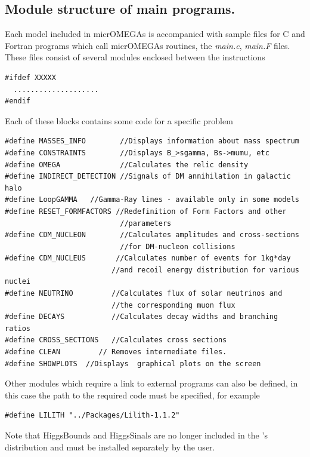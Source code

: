 \documentclass[12pt,a4paper]{article}
\begin{document}
\subsection{Module structure of main programs.}
Each model included in micrOMEGAs  is accompanied with sample files for
C and Fortran programs which call micrOMEGAs routines, the {\it main.c}, {\it main.F} files.  
These files   consist of
several modules enclosed between the instructions
\begin{verbatim}
#ifdef XXXXX
  ....................
#endif
\end{verbatim}
Each of these blocks  contains some code for a specific problem
{\small
\begin{verbatim}
#define MASSES_INFO        //Displays information about mass spectrum 
#define CONSTRAINTS        //Displays B_>sgamma, Bs->mumu, etc
#define OMEGA              //Calculates the relic density 
#define INDIRECT_DETECTION //Signals of DM annihilation in galactic halo
#define LoopGAMMA   //Gamma-Ray lines - available only in some models
#define RESET_FORMFACTORS //Redefinition of Form Factors and other
                           //parameters 
#define CDM_NUCLEON        //Calculates amplitudes and cross-sections
                           //for DM-nucleon collisions 
#define CDM_NUCLEUS       //Calculates number of events for 1kg*day
                         //and recoil energy distribution for various nuclei
#define NEUTRINO         //Calculates flux of solar neutrinos and
                         //the corresponding muon flux 
#define DECAYS           //Calculates decay widths and branching ratios  
#define CROSS_SECTIONS   //Calculates cross sections 
#define CLEAN         // Removes intermediate files.
#define SHOWPLOTS  //Displays  graphical plots on the screen
\end{verbatim}
}
Other modules which require a link to external programs can also be defined,  in this case the path to the required code must be specified, for example 


{\small
\begin{verbatim}
#define LILITH "../Packages/Lilith-1.1.2"
\end{verbatim}
}
Note that HiggsBounds and HiggsSinals are no longer included in the \micro's distribution and must  be installed separately by the user.
\end{document}
